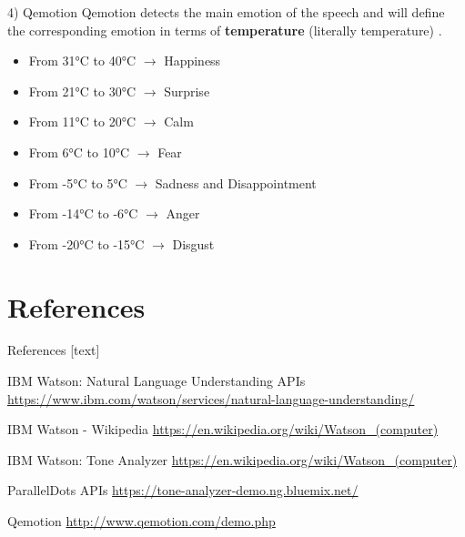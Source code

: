 \documentclass[xcolor=dvipsnames]{beamer}
\begin{document}
\begin{frame}{4) Qemotion}
Qemotion detects the main emotion of the speech and will define the corresponding emotion in terms of \textbf{temperature} (literally temperature) \cite{p5}.
\begin{itemize}
\item From \ang{31}C to \ang{40}C $\rightarrow$ Happiness
\item From \ang{21}C to \ang{30}C $\rightarrow$ Surprise
\item From \ang{11}C to \ang{20}C $\rightarrow$ Calm
\item From \ang{6}C to \ang{10}C $\rightarrow$ Fear
\item From \ang{-5}C to \ang{5}C $\rightarrow$ Sadness and Disappointment
\item From \ang{-14}C to \ang{-6}C $\rightarrow$ Anger
\item From \ang{-20}C to \ang{-15}C $\rightarrow$ Disgust
\end{itemize}
\end{frame}



\section{References}
\begin{frame}{References}
[text]
 \begin{thebibliography}{99} %
 IBM Watson: Natural Language Understanding APIs
\newblock \url{https://www.ibm.com/watson/services/natural-language-understanding/}

 IBM Watson - Wikipedia
\newblock \url{https://en.wikipedia.org/wiki/Watson_(computer)}

 IBM Watson: Tone Analyzer
\newblock \url{https://en.wikipedia.org/wiki/Watson_(computer)}

 ParallelDots APIs
\newblock \url{https://tone-analyzer-demo.ng.bluemix.net/}

 Qemotion
\newblock \url{http://www.qemotion.com/demo.php}

\end{thebibliography}

\end{frame}
\end{document}
